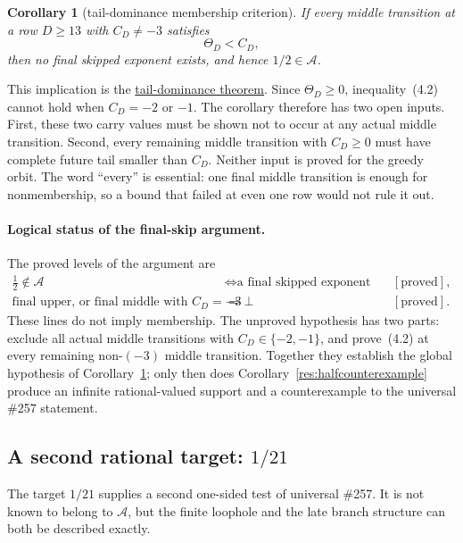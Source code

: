 \documentclass[11pt]{article}
\newcommand{\commit}{bb4e24651b37cd096d3749ef299c3317930b3a3b}
\newcommand{\repobase}{https://github.com/wcook04/plectis-lean-erdos249-257/blob/\commit}
\newcommand{\PK}{Erdos249257}
\newcommand{\lword}[4]{\href{\repobase/\PK/#1\#L#2}{#4}}
\newtheorem{corollary}[theorem]{Corollary}
\theoremstyle{definition}
\theoremstyle{remark}
\begin{document}
\begin{corollary}[tail-dominance membership criterion]\label{res:taildominance}
If every middle transition at a row \(D\geq13\) with \(C_D\neq-3\) satisfies
\[
 \Theta_D<C_D, \tag{4.2}
\]
then no final skipped exponent exists, and hence \(1/2\in\mathcal A\).
\end{corollary}
\noindent This implication is the
\lword{HalfCylinderLastProducerContradiction.lean}{436}{half_mem_mersenneAchievementSet_of_middleProducerTailEscapeExceptNegThree}{tail-dominance theorem}.
Since \(\Theta_D\geq0\), inequality~\textup{(4.2)} cannot hold when
\(C_D=-2\) or \(-1\).  The corollary therefore has two open inputs.  First,
these two carry values must be shown not to occur at any actual middle
transition.  Second, every remaining middle transition with \(C_D\geq0\)
must have complete future tail smaller than \(C_D\).  Neither input is proved
for the greedy orbit.  The word ``every'' is essential: one final middle
transition is enough for nonmembership, so a bound that failed at even one
row would not rule it out.

\paragraph{Logical status of the final-skip argument.}
The proved levels of the argument are
{\small\setlength{\arraycolsep}{3pt}
\[
\begin{array}{rcl}
 \frac12\notin\mathcal A
 &\Leftrightarrow
   \text{a final skipped exponent exists}
 &[\text{proved}],\\
 \text{final upper, or final middle with }C_D=-3
 &\Rightarrow\bot
 &[\text{proved}].
\end{array}
\]
}
These lines do not imply membership.  The unproved hypothesis has two parts:
exclude all actual middle transitions with \(C_D\in\{-2,-1\}\), and
prove~\textup{(4.2)} at every remaining non-\((-3)\) middle transition.
Together they establish the global hypothesis of
Corollary~\ref{res:taildominance}; only then does
Corollary~\ref{res:halfcounterexample} produce an infinite rational-valued
support and a counterexample to the universal \#257 statement.

\subsection{A second rational target: \(1/21\)}
\label{sec:twenty-one-frontier}

The target \(1/21\) supplies a second one-sided test of universal \#257.
It is not known to belong to \(\mathcal A\), but the finite loophole and the
late branch structure can both be described exactly.
\end{document}
